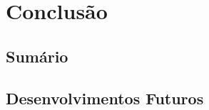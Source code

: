 \chapter{Conclusão}
\label{ch:conclusao}


\section{Sumário}
\label{sec:sumario}


\section{Desenvolvimentos Futuros}
\label{sec:desenvolvimentosfuturos}

